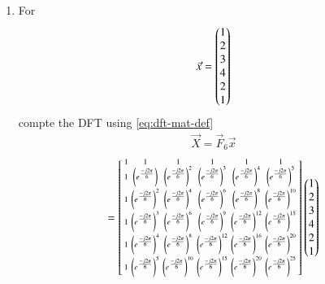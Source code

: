 \documentclass[journal,12pt,twocolumn]{IEEEtran}
\renewcommand\thesection{\arabic{section}}
\begin{document}
\begin{enumerate}[label=\thesection.\arabic*
	,ref=\thesection.\theenumi]
\begin{enumerate}[label=\arabic*.,ref=\thesection.\theenumi]
\begin{align}
	\vec{P}_8\vec{x} &= \myvec{\vec{x}_1\\\vec{x}_2} \\
	\vec{P}_4\vec{x}_1 &= \myvec{\vec{x}_3\\\vec{x}_4} \\ 
	\vec{P}_4\vec{x}_2 &= \myvec{\vec{x}_5\\\vec{x}_6}
\end{align}
where we define $x_3(k) = x(4k)$, $x_4(k) = x(4k + 2)$, $x_5(k) = x(4k + 1)$, and $x_6(k) = x(4k + 3)$ for $k = 0, 1$.
	\item For 
	\begin{align}
		\vec{x} = \begin{pmatrix}1\\2\\3\\4\\2\\1\end{pmatrix}
		\label{eq:equation1}
	\end{align}
	compte the DFT  
	using 
	\eqref{eq:dft-mat-def} \\
	\solution
	\begin{align}
		\vec{X} = \vec{F}_6 \vec{x}
	\end{align}	
	\begin{align}
		= \begin{bsmallmatrix}
			1	&	1	&	1	&	1	&	1	&	1\\
			1	&	\brak{e^{\frac{-j2\pi}{6}}}	&	\brak{e^{\frac{-j2\pi}{6}}}^2	&	\brak{e^{\frac{-j2\pi}{6}}}^3	&	\brak{e^{\frac{-j2\pi}{6}}}^4	&	\brak{e^{\frac{-j2\pi}{6}}}^5\\
			1	&	\brak{e^{\frac{-j2\pi}{6}}}^2	&	\brak{e^{\frac{-j2\pi}{6}}}^4	&	\brak{e^{\frac{-j2\pi}{6}}}^6	&	\brak{e^{\frac{-j2\pi}{6}}}^8	&	\brak{e^{\frac{-j2\pi}{6}}}^{10}\\
			1	&	\brak{e^{\frac{-j2\pi}{6}}}^3	&	\brak{e^{\frac{-j2\pi}{6}}}^6	&	\brak{e^{\frac{-j2\pi}{6}}}^9	&	\brak{e^{\frac{-j2\pi}{6}}}^{12}	&	\brak{e^{\frac{-j2\pi}{6}}}^{15}\\
			1	&	\brak{e^{\frac{-j2\pi}{6}}}^4	&	\brak{e^{\frac{-j2\pi}{6}}}^8	&	\brak{e^{\frac{-j2\pi}{6}}}^{12}	&	\brak{e^{\frac{-j2\pi}{6}}}^{16}	&	\brak{e^{\frac{-j2\pi}{6}}}^{20}\\
			1	&	\brak{e^{\frac{-j2\pi}{6}}}^5	&	\brak{e^{\frac{-j2\pi}{6}}}^{10}	&	\brak{e^{\frac{-j2\pi}{6}}}^{15}	&	\brak{e^{\frac{-j2\pi}{6}}}^{20}	&	\brak{e^{\frac{-j2\pi}{6}}}^{25}
		\end{bsmallmatrix}
		\myvec{1\\2\\3\\4\\2\\1}

\end{align}
\end{enumerate}
\end{enumerate}
\end{document}
